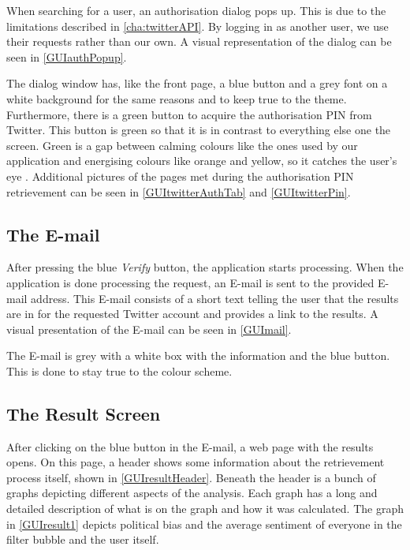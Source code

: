When searching for a user, an authorisation dialog pops up. This is due to the
limitations described in \autoref{cha:twitterAPI}. By logging in as another
user, we use their requests rather than our own. A visual representation of the
dialog can be seen in \autoref{GUIauthPopup}.


The dialog window has, like the front page, a blue button and a grey font on a
white background for the same reasons and to keep true to the theme.
Furthermore, there is a green button to acquire the authorisation PIN from
Twitter. This button is green so that it is in contrast to everything else one
the screen. Green is a gap between calming colours like the ones used by our
application and energising colours like orange and yellow, so it catches the
user's eye \citep[p. 60]{WebUI}. Additional pictures of the pages met during the
authorisation PIN retrievement can be seen in \autoref{GUItwitterAuthTab}
and \autoref{GUItwitterPin}.

\subsection{The E-mail}
After pressing the blue \textit{Verify} button, the application starts
processing.
When the application is done processing the request, an E-mail is sent to the provided E-mail address. This E-mail consists of a short text telling the user
that the results are in for the requested Twitter account and provides a link to
the results.
A visual presentation of the E-mail can be seen in \autoref{GUImail}.


The E-mail is grey with a white box with the information and the blue button.
This is done to stay true to the colour scheme. 

\subsection{The Result Screen}
After clicking on the blue button in the E-mail, a web page with the results
opens. On this page, a header shows some information about the retrievement
process itself, shown in \autoref{GUIresultHeader}. Beneath
the header is a bunch of graphs depicting different aspects of the analysis.
Each graph has a long and detailed description of what is on the graph and how
it was calculated. The graph in \autoref{GUIresult1} depicts political bias and
the average sentiment of everyone in the filter bubble and the user itself. 

